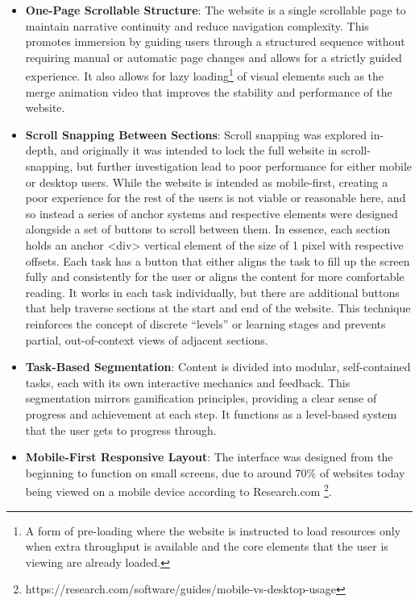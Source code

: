 \begin{itemize}
    \item \textbf{One-Page Scrollable Structure}: The website is a single scrollable page to maintain narrative continuity and reduce navigation complexity. 
    This promotes immersion by guiding users through a structured sequence without requiring manual or automatic page changes and allows for a strictly guided experience. 
    It also allows for lazy loading\footnote{A form of pre-loading where the website is instructed to load resources only when extra throughput is available and the core elements that the user is viewing are already loaded.} of visual elements such as the merge animation video that improves the stability and performance of the website.
    \item \textbf{Scroll Snapping Between Sections}: Scroll snapping was explored in-depth, and originally it was intended to lock the full website in scroll-snapping, but further investigation lead to poor performance for either mobile or desktop users. 
    While the website is intended as mobile-first, creating a poor experience for the rest of the users is not viable or reasonable here, and so instead a series of anchor systems and respective elements were designed alongside a set of buttons to scroll between them. 
    In essence, each section holds an anchor <div> vertical element of the size of 1 pixel with respective offsets. 
    Each task has a button that either aligns the task to fill up the screen fully and consistently for the user or aligns the content for more comfortable reading. 
    It works in each task individually, but there are additional buttons that help traverse sections at the start and end of the website. 
    This technique reinforces the concept of discrete “levels” or learning stages and prevents partial, out-of-context views of adjacent sections.
    \item \textbf{Task-Based Segmentation}: Content is divided into modular, self-contained tasks, each with its own interactive mechanics and feedback. 
    This segmentation mirrors gamification principles, providing a clear sense of progress and achievement at each step. 
    It functions as a level-based system that the user gets to progress through.
    \item \textbf{Mobile-First Responsive Layout}: The interface was designed from the beginning to function on small screens, due to around 70\% of websites today being viewed on a mobile device according to Research.com \footnote{https://research.com/software/guides/mobile-vs-desktop-usage}. 

\end{itemize}
